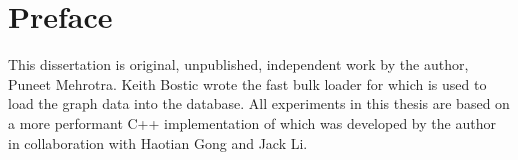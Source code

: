 
\chapter{Preface}

This dissertation is original, unpublished, independent work by the author, Puneet Mehrotra.
Keith Bostic wrote the fast bulk loader for \project{} which is used to load the graph data into the database.
All experiments in this thesis are based on a more performant C++ implementation of \project{} which was developed by the author in collaboration with Haotian Gong and Jack Li.